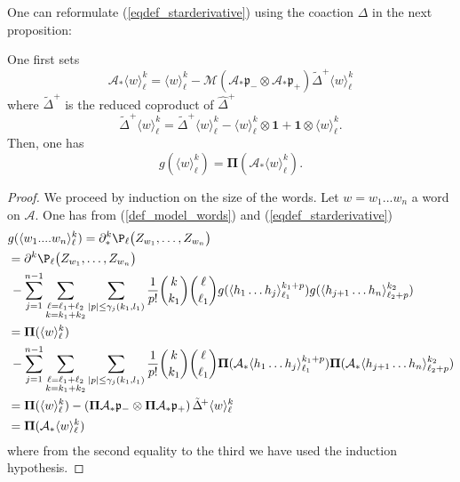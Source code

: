 \documentclass[11pt]{preprint}
\def\CA{\mathcal{A}}
\def\PPi{\boldsymbol{\Pi}}
\def\one{\mathbf{1}}
\def\eqref#1{(\ref{#1})}
\renewcommand{\lg}{\langle}
\newcommand{\rg}{\rangle}
\begin{document}
	One can reformulate \eqref{eqdef_starderivative} using the coaction  $  \Delta$ in the next proposition:
	\begin{proposition} \label{def_prop_antipode} One first sets
		\begin{equation}
			\CA_{*} \lg w \rg_\ell^k = \lg w \rg_\ell^k - \mathcal{M} \left( \CA_{*} \mathfrak{p}_{-} \otimes \CA_{*} \mathfrak{p}_+ \right) \tilde{\Delta}^{\! +} \lg w \rg_\ell^k
		\end{equation}
		where $ \tilde{\Delta}^{\! +}$ is the reduced coproduct of $ \hat{\Delta}^{\! +}$\text{:} $$ \tilde{\Delta}^{\! +}  \lg w \rg_\ell^k = \tilde{\Delta}^{\! +}  \lg w \rg_\ell^k - \lg w \rg_\ell^k \otimes \one + \one \otimes \lg w \rg_\ell^k.$$ Then, one has
		\begin{equation}
			g( \lg w \rg_\ell^k )  =\PPi( \CA_{*} \lg w \rg_\ell^k ).
			\end{equation}
		\end{proposition}
		\begin{proof} We proceed by induction on the size of the words. Let $ w = w_1...w_n $ a word on $\CA$. One has from \eqref{def_model_words} and \eqref{eqdef_starderivative}
			\begin{equation*}
				\begin{aligned}
				&	g( \lg w_1....w_n \rg_\ell^k )  = \partial^k_*\P_\ell\big(Z_{w_1},\dots,Z_{w_n}\big)
					\\
					 &  = \partial^k \P_\ell\big(Z_{w_1},\dots,Z_{w_n}\big)  
					\\
					&\, -
					\sum_{j=1}^{n-1}\sum_{\substack{\ell=\ell_1+\ell_2\\ k=k_1+k_2}}\sum_{|p|\leq \gamma_j(k_1,l_1)} \frac{1}{p!}\binom{k}{k_1}\binom{\ell}{\ell_1} g(\lg h_1 \dots h_j \rg_{\ell_1}^{k_1+p})
					 g( \lg h_{j+1} \dots h_n \rg_{\ell_2 + p}^{k_2})
					 \\ & =  \PPi (\lg w \rg_{\ell}^{k})  
					 \\
					 &\, -
					 \sum_{j=1}^{n-1}\sum_{\substack{\ell=\ell_1+\ell_2\\ k=k_1+k_2}}\sum_{|p|\leq \gamma_j(k_1,l_1)} \frac{1}{p!}\binom{k}{k_1}\binom{\ell}{\ell_1} \PPi( \CA_{*}\lg h_1 \dots h_j \rg_{\ell_1}^{k_1+p})
					 \PPi(\CA_{*} \lg h_{j+1} \dots h_n \rg_{\ell_2 + p}^{k_2})
					 \\ & =  \PPi(\lg w \rg_\ell^k) -  \left(  \PPi \CA_{*} \mathfrak{p}_{-} \otimes \PPi \CA_{*} \mathfrak{p}_+ \right) \tilde{\Delta}^{\! +} \lg w \rg_\ell^k
					 \\ & = \PPi( \CA_{*} \lg w \rg_\ell^k)
				\end{aligned}
			\end{equation*}
			where from the second equality to the third we have used the induction hypothesis.
			\end{proof}
	
\end{document}
